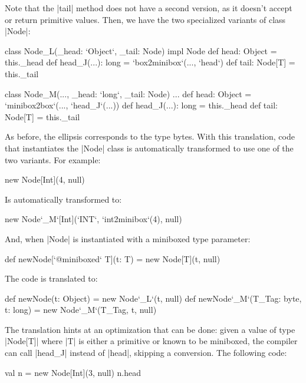 Note that the |tail| method does not have a second version, as it doesn't accept or return primitive values. Then, we have the two specialized variants of class |Node|:

\begin{lstlisting-nobreak}
 class Node_L(_head: `Object`, _tail: Node) impl Node {
   def head: Object = this._head
   def head_J(...): long = `box2minibox`(..., `head`)
   def tail: Node[T] = this._tail
 }

 class Node_M(..., _head: `long`, _tail: Node) ... {
   def head: Object = `minibox2box`(..., `head_J`(...))
   def head_J(...): long = this._head
   def tail: Node[T] = this._tail
 }
\end{lstlisting-nobreak}

As before, the ellipsis corresponds to the type bytes. With this translation, code that instantiates the |Node| class is automatically transformed to use one of the two variants. For example:

\begin{lstlisting-nobreak}
 new Node[Int](4, null)
\end{lstlisting-nobreak}

Is automatically transformed to:

\begin{lstlisting-nobreak}
 new Node`_M`[Int](`INT`, `int2minibox`(4), null)
\end{lstlisting-nobreak}

And, when |Node| is instantiated with a miniboxed type parameter:

\begin{lstlisting-nobreak}
 def newNode[`@miniboxed` T](t: T) =
   new Node[T](t, null)
\end{lstlisting-nobreak}

The code is translated to:

\begin{lstlisting-nobreak}
 def newNode(t: Object) = new Node`_L`(t, null)
 def newNode`_M`(T_Tag: byte, t: long) =
   new Node`_M`(T_Tag, t, null)
\end{lstlisting-nobreak}

The translation hints at an optimization that can be done: given a value of type |Node[T]| where |T| is either a primitive or known to be miniboxed, the compiler can call |head_J| instead of |head|, skipping a conversion. The following code:

\begin{lstlisting-nobreak}
 val n = new Node[Int](3, null)
 n.head
\end{lstlisting-nobreak}

